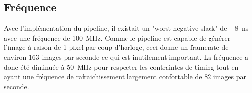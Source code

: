 \documentclass[LPSC_Labo03_SDeriaz]{subfiles}
\begin{document}
\subsection{Fréquence}
Avec l'implémentation du pipeline, il existait un "worst negative slack" de \SI{-8}{\nano\second} avec une fréquence de \SI{100}{\mega\hertz}. Comme le pipeline est capable de générer l'image à raison de 1 pixel par coup d'horloge, ceci donne un framerate de environ 163 images par seconde ce qui est inutilement important. La fréquence a donc été diminuée à \SI{50}{\mega\hertz} pour respecter les contraintes de timing tout en ayant une fréquence de rafraichissement largement confortable de 82 images par seconde.
\end{document}
